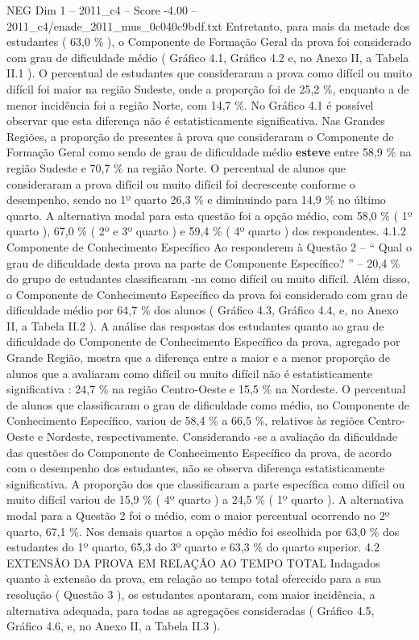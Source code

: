 \begin{textsample}{NEG Dim 1 – 2011\_c4 – Score -4.00 – 2011\_c4/enade\_2011\_mus\_0c040c9bdf.txt}
Entretanto, para mais da metade dos estudantes ( 63,0 \% ), o Componente de Formação Geral da prova foi considerado com grau de dificuldade médio ( Gráfico 4.1, Gráfico 4.2 e, no Anexo II, a Tabela II.1 ).
O percentual de estudantes que consideraram a prova como difícil ou muito difícil foi maior na região Sudeste, onde a proporção foi de 25,2 \%, enquanto a de menor incidência foi a região Norte, com 14,7 \%.
No Gráfico 4.1 é possível observar que esta diferença não é estatisticamente significativa.
Nas Grandes Regiões, a proporção de presentes à prova que consideraram o Componente de Formação Geral como sendo de grau de dificuldade médio \textbf{esteve} entre 58,9 \% na região Sudeste e 70,7 \% na região Norte.
O percentual de alunos que consideraram a prova difícil ou muito difícil foi decrescente conforme o desempenho, sendo no 1º quarto 26,3 \% e diminuindo para 14,9 \% no último quarto.
A alternativa modal para esta questão foi a opção médio, com 58,0 \% ( 1º quarto ), 67,0 \% ( 2º e 3º quarto ) e 59,4 \% ( 4º quarto ) dos respondentes. 4.1.2 Componente de Conhecimento Específico Ao responderem à Questão 2 – “ Qual o grau de dificuldade desta prova na parte de Componente Específico? ” – 20,4 \% do grupo de estudantes classificaram -na como difícil ou muito difícil.
Além disso, o Componente de Conhecimento Específico da prova foi considerado com grau de dificuldade médio por 64,7 \% dos alunos ( Gráfico 4.3, Gráfico 4.4, e, no Anexo II, a Tabela II.2 ).
A análise das respostas dos estudantes quanto ao grau de dificuldade do Componente de Conhecimento Específico da prova, agregado por Grande Região, mostra que a diferença entre a maior e a menor proporção de alunos que a avaliaram como difícil ou muito difícil não é estatisticamente significativa : 24,7 \% na região Centro-Oeste e 15,5 \% na Nordeste.
O percentual de alunos que classificaram o grau de dificuldade como médio, no Componente de Conhecimento Específico, variou de 58,4 \% a 66,5 \%, relativos às regiões Centro-Oeste e Nordeste, respectivamente.
Considerando -se a avaliação da dificuldade das questões do Componente de Conhecimento Específico da prova, de acordo com o desempenho dos estudantes, não se observa diferença estatisticamente significativa.
A proporção dos que classificaram a parte específica como difícil ou muito difícil variou de 15,9 \% ( 4º quarto ) a 24,5 \% ( 1º quarto ).
A alternativa modal para a Questão 2 foi o médio, com o maior percentual ocorrendo no 2º quarto, 67,1 \%.
Nos demais quartos a opção médio foi escolhida por 63,0 \% dos estudantes do 1º quarto, 65,3 do 3º quarto e 63,3 \% do quarto superior. 4.2 EXTENSÃO DA PROVA EM RELAÇÃO AO TEMPO TOTAL Indagados quanto à extensão da prova, em relação ao tempo total oferecido para a sua resolução ( Questão 3 ), os estudantes apontaram, com maior incidência, a alternativa adequada, para todas as agregações consideradas ( Gráfico 4.5, Gráfico 4.6, e, no Anexo II, a Tabela II.3 ).

\end{textsample}

